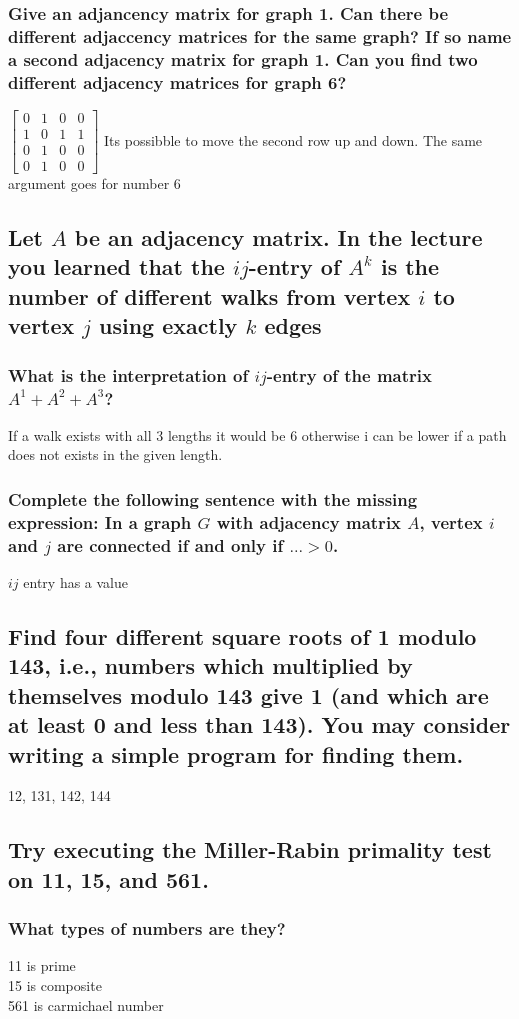 \documentclass[12pt, a4paper]{article}
\begin{document}
			\subsubsection{Give an adjancency matrix for graph 1. Can there be different adjaccency matrices for the same graph? If so name a second adjacency matrix for graph 1. Can you find two different adjacency matrices for graph 6?}
				$\begin{bmatrix}
					0&1&0&0\\
					1&0&1&1\\
					0&1&0&0\\
					0&1&0&0
				\end{bmatrix}$
				Its possibble to move the second row up and down.
				The same argument goes for number 6
		\subsection{Let $A$ be an adjacency matrix. In the lecture you learned that the $ij$-entry of $A^k$ is the number of different walks from vertex $i$ to vertex $j$ using exactly $k$ edges}
			\subsubsection{What is the interpretation of $ij$-entry of the matrix $A^1+A^2+A^3$?}
				If a walk exists with all 3 lengths it would be 6 otherwise i can be lower if a path does not exists in the given length.
			\subsubsection{Complete the following sentence with the missing expression: In a graph $G$ with adjacency matrix $A$, vertex $i$ and $j$ are connected if and only if $...>0$.}
				$ij$ entry has a value
		\setcounter{subsection}{0}
		\subsection{Find four different square roots of 1 modulo 143, i.e., numbers which multiplied by themselves modulo 143 give 1 (and which are at least 0 and less than 143). You may consider writing a simple program for finding them.}
			12, 131, 142, 144
		\subsection{Try executing the Miller-Rabin primality test on 11, 15, and 561.}
			\subsubsection{What types of numbers are they?}
				11 is prime\\
				15 is composite\\
				561 is carmichael number
\end{document}
